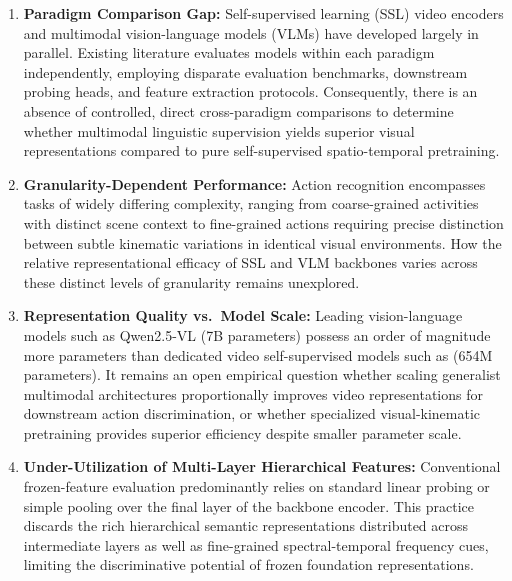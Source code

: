 \begin{enumerate}[leftmargin=*]
    \item \textbf{Paradigm Comparison Gap:} Self-supervised learning (SSL) video encoders and multimodal vision-language models (VLMs) have developed largely in parallel. Existing literature evaluates models within each paradigm independently, employing disparate evaluation benchmarks, downstream probing heads, and feature extraction protocols. Consequently, there is an absence of controlled, direct cross-paradigm comparisons to determine whether multimodal linguistic supervision yields superior visual representations compared to pure self-supervised spatio-temporal pretraining.
    \item \textbf{Granularity-Dependent Performance:} Action recognition encompasses tasks of widely differing complexity, ranging from coarse-grained activities with distinct scene context to fine-grained actions requiring precise distinction between subtle kinematic variations in identical visual environments. How the relative representational efficacy of SSL and VLM backbones varies across these distinct levels of granularity remains unexplored.
    \item \textbf{Representation Quality vs.\ Model Scale:} Leading vision-language models such as Qwen2.5-VL (7B parameters) possess an order of magnitude more parameters than dedicated video self-supervised models such as \vjepaa{} (654M parameters). It remains an open empirical question whether scaling generalist multimodal architectures proportionally improves video representations for downstream action discrimination, or whether specialized visual-kinematic pretraining provides superior efficiency despite smaller parameter scale.
    \item \textbf{Under-Utilization of Multi-Layer Hierarchical Features:} Conventional frozen-feature evaluation predominantly relies on standard linear probing or simple pooling over the final layer of the backbone encoder. This practice discards the rich hierarchical semantic representations distributed across intermediate layers as well as fine-grained spectral-temporal frequency cues, limiting the discriminative potential of frozen foundation representations.
\end{enumerate}



